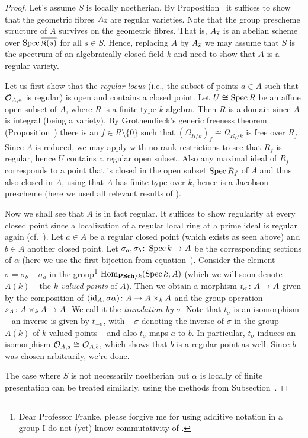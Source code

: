 \documentclass[a4paper,parskip=half,numbers=enddot, DIV=12]{scrreprt}
\begin{document}
\begin{proof}
	Let's assume $S$ is locally noetherian. By Proposition~ it suffices to show that the geometric fibres $A_{\overline{s}}$ are regular varieties. Note that the group prescheme structure of $A$ survives on the geometric fibres. That is, $A_{\overline{s}}$ is an abelian scheme over $\operatorname{Spec} \overline{\mathfrak{K}(s)}$ for all $s\in S$. Hence, replacing $A$ by $A_{\overline{s}}$ we may assume that $S$ is the spectrum of an algebraically closed field $k$ and need to show that $A$ is a regular variety.
	
	Let us first show that the \emph{regular locus} (i.e., the subset of points $a\in A$ such that $\mathcal{O}_{A,a}$ is regular) is open and contains a closed point. Let $U\cong \operatorname{Spec} R$ be an affine open subset of $A$, where $R$ is a finite type $k$-algebra. Then $R$ is a domain since $A$ is integral (being a variety). By Grothendieck's generic freeness theorem (Proposition~) there is an $f\in R\setminus \{0\}$ such that $(\Omega_{R/k})_f\cong \Omega_{R_f/k}$ is free over $R_f$. Since $A$ is reduced, we may apply \cite[Proposition~1.6.3]{alg2} with no rank restrictions to see that $R_f$ is regular, hence $U$ contains a regular open subset. Also any maximal ideal of $R_f$ corresponds to a point that is closed in the open subset $\operatorname{Spec} R_f$ of $A$ and thus also closed in $A$, using that $A$ has finite type over $k$, hence is a Jacobson prescheme (here we used all relevant results of \cite[Section~2.4]{alggeo1}).
	
	Now we shall see that $A$ is in fact regular. It suffices to show regularity at every closed point since a localization of a regular local ring at a prime ideal is regular again (cf.\ \cite[Corollary~2.2.1]{homalg}). Let $a\in A$ be a regular closed point (which exists as seen above) and $b\in A$ another closed point. Let $\sigma_a,\sigma_b\colon \Spec k\morphism A$ be the corresponding sections of $\alpha$ (here we use the first bijection from equation~). Consider the element $\sigma=\sigma_b-\sigma_a$ in the group\footnote{Dear Professor Franke, please forgive me for using additive notation in a group I do not (yet) know commutativity of \Winkey[1.2].} $\Hom_{\cat{PSch}/k}(\Spec k,A)$ (which we will soon denote $A(k)$ -- the \emph{$k$-valued points} of $A$). Then we obtain a morphism $t_\sigma\colon A\morphism A$ given by the composition of $(\id_A,\sigma\alpha)\colon A\morphism A\times_kA$ and the group operation $s_A\colon A\times_kA\morphism A$. We call it the \emph{translation by $\sigma$}. Note that $t_\sigma$ is an isomorphism -- an inverse is given by $t_{-\sigma}$, with $-\sigma$ denoting the inverse of $\sigma$ in the group $A(k)$ of $k$-valued points -- and also $t_\sigma$ maps $a$ to $b$. In particular, $t_\sigma$ induces an isomorphism $\mathcal{O}_{A,a}\cong \mathcal{O}_{A,b}$, which shows that $b$ is a regular point as well. Since $b$ was chosen arbitrarily, we're done.
	
	The case where $S$ is not necessarily noetherian but $\alpha$ is locally of finite presentation can be treated similarly, using the methods from Subsection~.
\end{proof}
\end{document}
